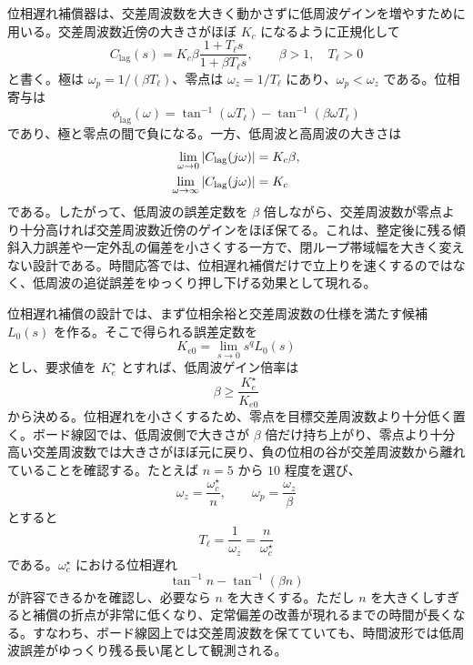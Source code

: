 位相遅れ補償器は、交差周波数を大きく動かさずに低周波ゲインを増やすために用いる。交差周波数近傍の大きさがほぼ $K_c$ になるように正規化して
\begin{equation}
  C_{\mathrm{lag}}(s)
  =K_c\beta\frac{1+T_\ell s}{1+\beta T_\ell s},
  \qquad \beta>1,\quad T_\ell>0
\end{equation}
と書く。極は $\omega_p=1/(\beta T_\ell)$、零点は $\omega_z=1/T_\ell$ にあり、$\omega_p<\omega_z$ である。位相寄与は
\begin{equation}
  \phi_{\mathrm{lag}}(\omega)
  =\tan^{-1}(\omega T_\ell)
  -\tan^{-1}(\beta\omega T_\ell)
\end{equation}
であり、極と零点の間で負になる。一方、低周波と高周波の大きさは
\begin{align}
  \lim_{\omega\to0}\left|C_{\mathrm{lag}}(j\omega)\right|
    &=K_c\beta,\\
  \lim_{\omega\to\infty}\left|C_{\mathrm{lag}}(j\omega)\right|
    &=K_c
\end{align}
である。したがって、低周波の誤差定数を $\beta$ 倍しながら、交差周波数が零点より十分高ければ交差周波数近傍のゲインをほぼ保てる。これは、整定後に残る傾斜入力誤差や一定外乱の偏差を小さくする一方で、閉ループ帯域幅を大きく変えない設計である。時間応答では、位相遅れ補償だけで立上りを速くするのではなく、低周波の追従誤差をゆっくり押し下げる効果として現れる。

位相遅れ補償の設計では、まず位相余裕と交差周波数の仕様を満たす候補 $L_0(s)$ を作る。そこで得られる誤差定数を
\begin{equation}
  K_{e0}=\lim_{s\to0}s^q L_0(s)
\end{equation}
とし、要求値を $K_e^\star$ とすれば、低周波ゲイン倍率は
\begin{equation}
  \beta\ge\frac{K_e^\star}{K_{e0}}
\end{equation}
から決める。位相遅れを小さくするため、零点を目標交差周波数より十分低く置く。ボード線図では、低周波側で大きさが $\beta$ 倍だけ持ち上がり、零点より十分高い交差周波数では大きさがほぼ元に戻り、負の位相の谷が交差周波数から離れていることを確認する。たとえば $n=5$ から $10$ 程度を選び、
\begin{equation}
  \omega_z=\frac{\omega_c^\star}{n},
  \qquad
  \omega_p=\frac{\omega_z}{\beta}
\end{equation}
とすると
\begin{equation}
  T_\ell=\frac{1}{\omega_z}
  =\frac{n}{\omega_c^\star}
\end{equation}
である。$\omega_c^\star$ における位相遅れ
\begin{equation}
  \tan^{-1}n-\tan^{-1}(\beta n)
\end{equation}
が許容できるかを確認し、必要なら $n$ を大きくする。ただし $n$ を大きくしすぎると補償の折点が非常に低くなり、定常偏差の改善が現れるまでの時間が長くなる。すなわち、ボード線図上では交差周波数を保てていても、時間波形では低周波誤差がゆっくり残る長い尾として観測される。

